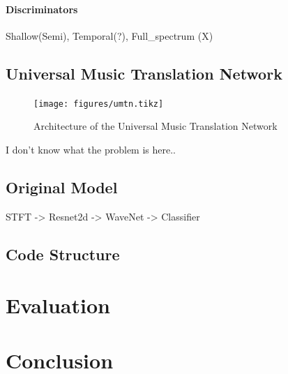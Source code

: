 \documentclass[]{article}
\begin{document}
\paragraph{Discriminators}

Shallow(Semi), Temporal(?), Full\_spectrum (X)

\hypertarget{universal-music-translation-network-1}{%
\subsection{Universal Music Translation
Network}\label{universal-music-translation-network-1}}

\begin{figure}[h]
    \texttt{[image: figures/umtn.tikz]}
\centering 
\caption{Architecture of the Universal Music Translation Network \label{fig:umtn}}
\end{figure}

I don't know what the problem is here..

\hypertarget{original-model}{%
\subsection{Original Model}\label{original-model}}

STFT -\textgreater{} Resnet2d -\textgreater{} WaveNet -\textgreater{}
Classifier

\hypertarget{code-structure}{%
\subsection{Code Structure}\label{code-structure}}

\hypertarget{evaluation}{%
\section{Evaluation}\label{evaluation}}

\hypertarget{conclusion}{%
\section{Conclusion}\label{conclusion}}
\end{document}
